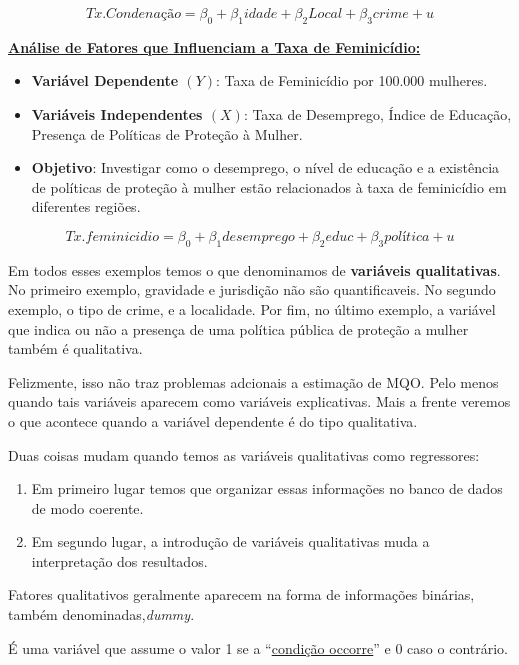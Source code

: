 \documentclass[
  letterpaper,
  DIV=11,
  numbers=noendperiod]{scrreprt}
\providecommand{\tightlist}{%
  \setlength{\itemsep}{0pt}\setlength{\parskip}{0pt}}
\begin{document}
\[Tx.Condenação = \beta_0 + \beta_1  idade  +  \beta_2 Local  + \beta_3  crime + u\]

\ul{\textbf{Análise de Fatores que Influenciam a Taxa de Feminicídio:}}

\begin{itemize}
\tightlist
\item
  \textbf{Variável Dependente \((Y)\)}: Taxa de Feminicídio por 100.000
  mulheres.
\item
  \textbf{Variáveis Independentes \((X)\)}: Taxa de Desemprego, Índice
  de Educação, Presença de Políticas de Proteção à Mulher.
\item
  \textbf{Objetivo}: Investigar como o desemprego, o nível de educação e
  a existência de políticas de proteção à mulher estão relacionados à
  taxa de feminicídio em diferentes regiões.
\end{itemize}

\[Tx.feminicidio = \beta_0 + \beta_1 desemprego + \beta_2 educ + \beta_3 política + u \]

Em todos esses exemplos temos o que denominamos de \textbf{variáveis
qualitativas}. No primeiro exemplo, gravidade e jurisdição não são
quantificaveis. No segundo exemplo, o tipo de crime, e a localidade. Por
fim, no último exemplo, a variável que indica ou não a presença de uma
política pública de proteção a mulher também é qualitativa.

Felizmente, isso não traz problemas adcionais a estimação de MQO. Pelo
menos quando tais variáveis aparecem como variáveis explicativas. Mais a
frente veremos o que acontece quando a variável dependente é do tipo
qualitativa.

Duas coisas mudam quando temos as variáveis qualitativas como
regressores:

\begin{enumerate}
\def\labelenumi{\arabic{enumi}.}
\tightlist
\item
  Em primeiro lugar temos que organizar essas informações no banco de
  dados de modo coerente.
\item
  Em segundo lugar, a introdução de variáveis qualitativas muda a
  interpretação dos resultados.
\end{enumerate}

Fatores qualitativos geralmente aparecem na forma de informações
binárias, também denominadas,\emph{dummy}.

\begin{tcolorbox}[enhanced jigsaw, leftrule=.75mm, coltitle=black, colframe=quarto-callout-note-color-frame, toprule=.15mm, opacitybacktitle=0.6, bottomtitle=1mm, bottomrule=.15mm, titlerule=0mm, toptitle=1mm, title=\textcolor{quarto-callout-note-color}{\faInfo}\hspace{0.5em}{Variável Binária ou Dummy:}, arc=.35mm, breakable, opacityback=0, colbacktitle=quarto-callout-note-color!10!white, colback=white, left=2mm, rightrule=.15mm]

É uma variável que assume o valor 1 se a ``\ul{condição occorre}'' e 0
caso o contrário.

\end{tcolorbox}
\end{document}
